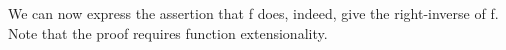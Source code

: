 %
We can now express the assertion that  \ab f does, indeed, give the right-inverse of \ab f.  Note that the proof requires function extensionality.
\ccpad
